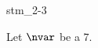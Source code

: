\documentclass{stex}
\begin{document}
\begin{smodule}{stm_2-3}
  
  \begin{sassertion}[id=stm-2.3]
    Let $\nvar$ be a    $7$.
  \end{sassertion}
\end{smodule}
\end{document}
